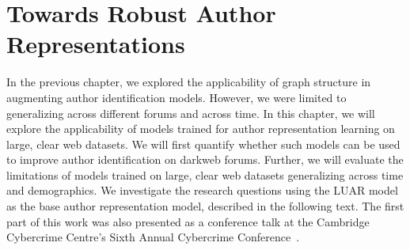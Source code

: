 \chapter{Towards Robust Author Representations}
\label{chp:stylometry_extensions}

In the previous chapter, we explored the applicability of graph structure in augmenting author identification models. 
However, we were limited to generalizing across different forums and across time.
In this chapter, we will explore the applicability of models trained for author representation learning on large, clear web datasets.
We will first quantify whether such models can be used to improve author identification on darkweb forums.
Further, we will evaluate the limitations of models trained on large, clear web datasets  generalizing across time and demographics.
We investigate the research questions using the LUAR model~\citep{riverastao2021learning} as the base author representation model, described in the following text.
The first part of this work was also presented as a conference talk at the Cambridge Cybercrime Centre's Sixth Annual Cybercrime Conference~\citep{maneriker2023following}.






